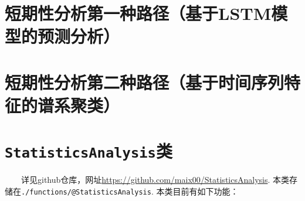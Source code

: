 \documentclass[a4paper, titlepage]{article}
\begin{document}
    \newpage
    \section{短期性分析第一种路径（基于LSTM模型的预测分析）}\label{第一种路径}
    \newpage
    \section{短期性分析第二种路径（基于时间序列特征的谱系聚类）}\label{第二种路径}
    \newpage
    \appendix
    \section{\texttt{StatisticsAnalysis}类}\label{app:StatisticsAnalysis}
    　　详见github仓库，网址\url{https://github.com/maix00/StatisticsAnalysis}. 本类存储在\texttt{./functions/@StatisticsAnalysis}. 本类目前有如下功能：
\end{document}
